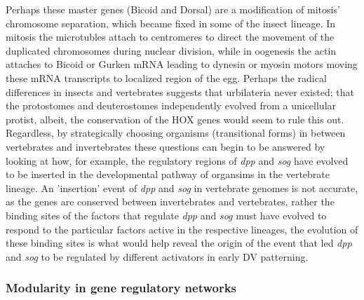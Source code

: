   Perhaps these master genes (Bicoid and Dorsal) are a modification of mitosis' chromosome separation, which became fixed in some of the insect lineage.  In mitosis the microtubles attach to centromeres to direct the movement of the duplicated chromosomes during nuclear division, while in oogenesis the actin attaches to Bicoid or Gurken mRNA leading to dynesin or myosin motors moving these mRNA transcripts to localized region of the egg.  Perhaps the radical differences in insects and vertebrates suggests that urbilateria never existed; that the protostomes and deuterostomes independently evolved from a unicellular protist, albeit, the conservation of the HOX genes would seem to rule this out.  Regardless, by strategically choosing organisms (transitional forms) in between vertebrates and invertebrates these questions can begin to be answered by looking at how, for example, the regulatory regions of \textit{dpp} and \textit{sog} have evolved to be inserted in the developmental pathway of organsims in the vertebrate lineage.  An 'insertion' event of \textit{dpp} and \textit{sog} in vertebrate genomes is not accurate, as the genes are conserved between invertebrates and vertebrates, rather the binding sites of the factors that regulate \textit{dpp} and \textit{sog} must have evolved to respond to the particular factors active in the respective lineages, the evolution of these binding sites is what would help reveal the origin of the event that led \textit{dpp} and \textit{sog} to be regulated by different activators in early DV patterning.

\subsubsection{Modularity in gene regulatory networks}

